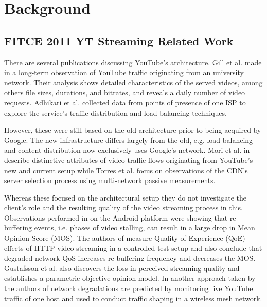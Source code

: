\chapter{Background}
\label{chap:relatedwork}



\section{FITCE 2011 YT Streaming Related Work}

There are several publications discussing YouTube's architecture. Gill et al. made in \cite{gill2007youtube} a long-term observation of YouTube traffic originating from an university network. Their analysis shows detailed characteristics of the served videos, among others file sizes, durations, and bitrates, and reveals a daily number of video requests. Adhikari et al. \cite{adhikari2010youtube} collected data from points of presence of one ISP to explore the service's traffic distribution and load balancing techniques.

However, these were still based on the old architecture prior to being acquired by Google. The new infrastructure differs largely from the old, e.g. load balancing and content distribution now exclusively uses Google’s network. Mori et al. in \cite{mori2010characterizing} describe distinctive attributes of video traffic flows originating from YouTube's new and current setup while Torres et al. \cite{torres2011dissecting} focus on observations of the CDN's server selection process using multi-network passive measurements.


Whereas these focused on the architectural setup they do not investigate the client's role and the resulting quality of the video streaming process in this. 
Observations performed in \cite{ketyko2010qoe} on the Android platform were showing that re-buffering events, i.e. phases of video stalling, can result in a large drop in Mean Opinion Score (MOS). The authors of \cite{mokmeasuring} measure Quality of Experience (QoE) effects of HTTP video streaming in a controlled test setup and also conclude that degraded network QoS increases re-buffering frequency and decreases the MOS. Gustafsson et al. \cite{gustafsson2008measmmmquality} also discovers the loss in perceived streaming quality and establishes a parametric objective opinion model. In another approach taken by the authors of \cite{staehle2010yomo, staehle2011aquarema} network degradations are predicted by monitoring live YouTube traffic of one host and used to conduct traffic shaping in a wireless mesh network.


